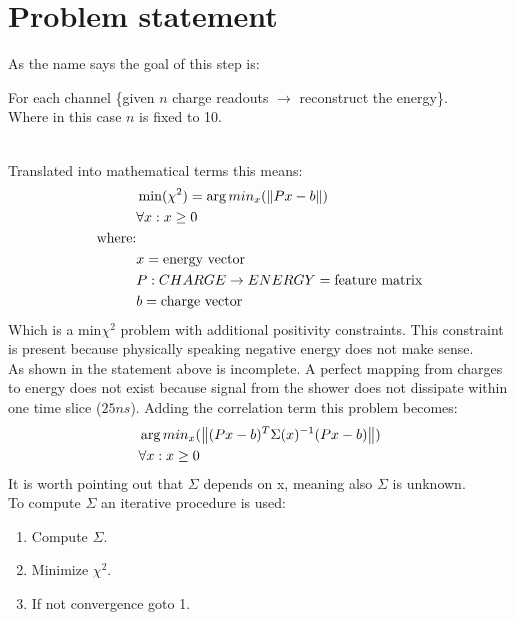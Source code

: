 \section{Problem statement}
As the name says the goal of this step is: \\
\begin{claim}
  For each channel \{given $n$ charge readouts $\rightarrow$ reconstruct the energy\}. \\
  \quad Where in this case $n$ is fixed to 10. 
\end{claim}\\
Translated into mathematical terms this means:
\begin{equation}\label{eq:chisq}
  \begin{split}
    & \min(\chi^2)=\arg min_x(\left\lVert Px - b\right\rVert) \\
    & \forall x: x \geq 0\\
    \text{where:}&  \\
    & x = \text{energy vector} \\
    & P:CHARGE \rightarrow ENERGY =\text{feature matrix} \\
    & b = \text{charge vector}
  \end{split}
\end{equation}
Which is a min$\chi^2$ problem with additional positivity constraints. This constraint is present because physically speaking negative energy does not make sense. \\
As shown in \cite{amplituamplitude_reconde_recon} the statement above is incomplete. A perfect mapping from charges to energy does not exist because signal from the shower does not dissipate within one time slice ($25ns$). Adding the correlation term this problem becomes:
\begin{equation}\label{eq:constrained_chi_sq}
  \begin{split}
      &\arg min_x(\left\lVert(Px - b)^T\Sigma(x)^{-1}(Px - b)\right\rVert) \\
      & \forall x: x \geq 0\\
  \end{split}
\end{equation}
It is worth pointing out that $\Sigma$ depends on x, meaning also $\Sigma$ is unknown. \\
To compute $\Sigma$ an iterative procedure is used:
\begin{enumerate}
  \item Compute $\Sigma$.
  \item Minimize $\chi^2$.
  \item If not convergence goto 1.
\end{enumerate}
